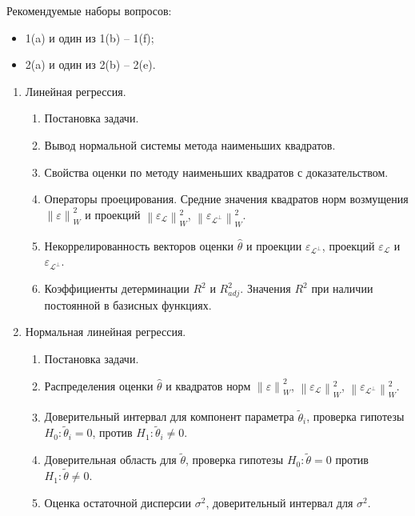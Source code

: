\documentclass[a4paper,12pt]{article}
\newcommand{\norm}[1]{\left \| #1 \right \|}
\newcommand{\pr}[2]{#1_\mathcal{#2}}
\newcommand{\pro}[2]{#1_{\mathcal{#2}^\perp}}
\begin{document}
Рекомендуемые наборы вопросов:
\begin{itemize}
      \item 1(a) и один из 1(b) -- 1(f);
      \item 2(a) и один из 2(b) -- 2(e).
\end{itemize}

\begin{enumerate}
      \item Линейная регрессия.
            \begin{enumerate}
                  \item Постановка задачи.
                  \item Вывод нормальной системы метода наименьших квадратов.
                  \item Свойства оценки по методу наименьших квадратов с доказательством.
                  \item Операторы проецирования. Средние значения квадратов норм возмущения $\norm{\varepsilon}_W^2$ и проекций
                        $\norm{\pr{\varepsilon}{L}}_W^2$, $\norm{\pro{\varepsilon}{L}}_W^2$.
                  \item Некоррелированность векторов оценки $\widehat{\theta}$ и проекции $\pro{\varepsilon}{L}$, проекций $\pr{\varepsilon}{L}$
                        и $\pro{\varepsilon}{L}$.
                  \item Коэффициенты детерминации $R^2$ и $R_{adj}^2$. Значения $R^2$ при наличии постоянной в базисных функциях.
            \end{enumerate}
      \item Нормальная линейная регрессия.
            \begin{enumerate}
                  \item Постановка задачи.
                  \item Распределения оценки $\widehat{\theta}$ и квадратов норм $\norm{\varepsilon}_W^2$, $\norm{\pr{\varepsilon}{L}}_W^2$,
                        $\norm{\pro{\varepsilon}{L}}_W^2$.
                  \item Доверительный интервал для компонент параметра $\widetilde{\theta}_i$, проверка гипотезы $H_0: \widetilde{\theta}_i = 0$,
                        против $H_1: \widetilde{\theta}_i \neq 0$.
                  \item Доверительная область для $\widetilde{\theta}$, проверка гипотезы $H_0: \widetilde{\theta} = 0$ против
                        $H_1: \widetilde{\theta} \neq 0$.
                  \item Оценка остаточной дисперсии $\sigma^2$, доверительный интервал для $\sigma^2$.
            \end{enumerate}
\end{enumerate}
\end{document}
